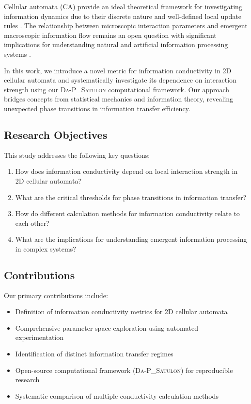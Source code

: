 \documentclass[twocolumn,showpacs,preprintnumbers,amsmath,amssymb,prb]{revtex4-2}
\newcommand{\satulon}{\textsc{Da-P\_Satulon}}
\begin{document}
Cellular automata (CA) provide an ideal theoretical framework for investigating information dynamics due to their discrete nature and well-defined local update rules \cite{wolfram2002new}. The relationship between microscopic interaction parameters and emergent macroscopic information flow remains an open question with significant implications for understanding natural and artificial information processing systems \cite{mitchell2009complexity}.

In this work, we introduce a novel metric for information conductivity in 2D cellular automata and systematically investigate its dependence on interaction strength using our \satulon{} computational framework. Our approach bridges concepts from statistical mechanics and information theory, revealing unexpected phase transitions in information transfer efficiency.

\subsection{Research Objectives}
\label{sec:objectives}

This study addresses the following key questions:
\begin{enumerate}
\item How does information conductivity depend on local interaction strength in 2D cellular automata?
\item What are the critical thresholds for phase transitions in information transfer?
\item How do different calculation methods for information conductivity relate to each other?
\item What are the implications for understanding emergent information processing in complex systems?
\end{enumerate}

\subsection{Contributions}
\label{sec:contributions}

Our primary contributions include:
\begin{itemize}
\item Definition of information conductivity metrics for 2D cellular automata
\item Comprehensive parameter space exploration using automated experimentation
\item Identification of distinct information transfer regimes
\item Open-source computational framework (\satulon{}) for reproducible research
\item Systematic comparison of multiple conductivity calculation methods
\end{itemize}
\end{document}
